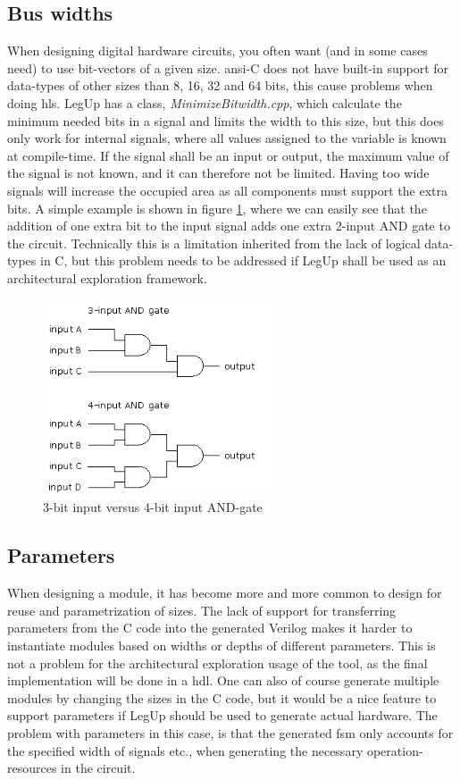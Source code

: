 \subsection{Bus widths}
When designing digital hardware circuits, you often want (and in some cases need) to use bit-vectors of a given size. \gls{ansi}-C does not have built-in support for data-types of other sizes than 8, 16, 32 and 64 bits, this cause problems when doing \gls{hls}. LegUp has a class, \textit{MinimizeBitwidth.cpp}, which calculate the minimum needed bits in a signal and limits the width to this size, but this does only work for internal signals, where all values assigned to the variable is known at compile-time. If the signal shall be an input or output, the maximum value of the signal is not known, and it can therefore not be limited. Having too wide signals will increase the occupied area as all components must support the extra bits. A simple example is shown in figure \ref{fig:andgate34}, where we can easily see that the addition of one extra bit to the input signal adds one extra 2-input AND gate to the circuit. Technically this is a limitation inherited from the lack of logical data-types in C, but this problem needs to be addressed if LegUp shall be used as an architectural exploration framework.
\begin{figure}[hbpt]
\centering
\includegraphics[width=0.6\textwidth]{../figs/AndGate34Bit.png}
\caption{\label{fig:andgate34}3-bit input versus 4-bit input AND-gate}
\end{figure}

\subsection{\label{subsec:parameterprobs}Parameters}
When designing a module, it has become more and more common to design for reuse and parametrization of sizes. The lack of support for transferring parameters from the C code into the generated Verilog makes it harder to instantiate modules based on widths or depths of different parameters. This is not a problem for the architectural exploration usage of the tool, as the final implementation will be done in a \gls{hdl}. One can also of course generate multiple modules by changing the sizes in the C code, but it would be a nice feature to support parameters if LegUp should be used to generate actual hardware. The problem with parameters in this case, is that the generated \gls{fsm} only accounts for the specified width of signals etc., when generating the necessary operation-resources in the circuit.

